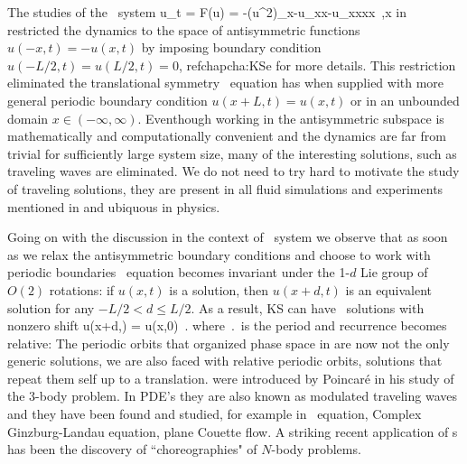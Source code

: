 The studies of the \KS\ system
\beq
  u_t = F(u) = -{\textstyle{}}(u^2)_x-u_{xx}-u_{xxxx}
    \,,\qquad   x \in [-L/2,L/2]
in  restricted the dynamics 
to the space of antisymmetric functions $u(-x,t)=-u(x,t)$ by imposing
boundary condition $u(-L/2,t)=u(L/2,t)=0$, \cf refchap{cha:KSe} for more
details. This restriction eliminated the translational symmetry \KS\ equation
has when supplied with more general periodic boundary condition $u(x+L,t)=u(x,t)$ or
in an unbounded domain $x\in(-\infty,\infty)$. Eventhough working in the antisymmetric
subspace is mathematically and computationally convenient and the dynamics are far
from trivial for sufficiently large system size, many of the interesting solutions,
such as traveling waves are eliminated. We do not need to try hard to motivate the 
study of traveling solutions, they are present in all fluid simulations and experiments
mentioned in  and ubiquous in physics.

Going on with the discussion in the context of \KS\ system we observe that as soon as 
we relax the antisymmetric boundary conditions and choose to work with periodic boundaries
\KS\ equation becomes invariant under the 1-$d$ Lie group of $O(2)$ rotations: if
$u(x,t)$ is a solution, then $u(x+d,t)$ is an equivalent
solution for any $-L/2 < d \leq L/2$.
As a result,
KS can have \rpo\ solutions with nonzero shift
\beq
u(x+d,\period{}) = u(x,0)
\,.
where $\period{}$ is the period and recurrence becomes relative: The periodic orbits that organized phase space in  are now not the only generic solutions, we are
also faced with relative periodic orbits, solutions that repeat them self up to a translation. 
were introduced by Poincar\'e in his study of the 3-body problem.
In PDE's they are also known as modulated traveling waves and they have been found and studied, for example
in \KS\ equation, Complex Ginzburg-Landau equation, plane Couette flow.
A striking recent application of \rpo s has been the discovery
of ``choreographies" of $N$-body problems.

